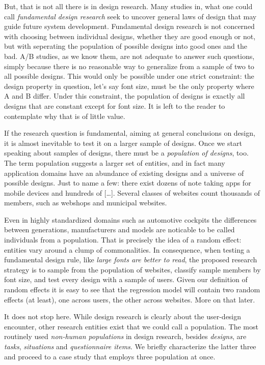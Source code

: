 \documentclass[]{svmono}
\theoremstyle{definition}
\theoremstyle{definition}
\theoremstyle{definition}
\theoremstyle{remark}
\begin{document}
But, that is not all there is in design research. Many studies in, what
one could call \emph{fundamental design research} seek to uncover
general laws of design that may guide future system development.
Fundamental design research is not concerned with choosing between
individual designs, whether they are good enough or not, but with
seperating the population of possible designs into good ones and the
bad. A/B studies, as we know them, are not adequate to answer such
questions, simply because there is no reasonable way to generalize from
a sample of two to all possible designs. This would only be possible
under one strict constraint: the design property in question, let's say
font size, must be the only property where A and B differ. Under this
constraint, the population of designs is exactly all designs that are
constant except for font size. It is left to the reader to contemplate
why that is of little value.

If the research question is fundamental, aiming at general conclusions
on design, it is almost inevitable to test it on a larger sample of
designs. Once we start speaking about samples of designs, there must be
a \emph{population of designs}, too. The term population suggests a
larger set of entities, and in fact many application domains have an
abundance of existing designs and a universe of possible designs. Just
to name a few: there exist dozens of note taking apps for mobile devices
and hundreds of {[}\ldots{}{]}. Several classes of websites count
thousands of members, such as webshops and municipal websites.

Even in highly standardized domains such as automotive cockpits the
differences between generations, manufacturers and models are noticable
to be called individuals from a population. That is precisely the idea
of a random effect: entities vary around a clump of commonalities. In
consequence, when testing a fundamental design rule, like \emph{large
fonts are better to read}, the proposed research strategy is to sample
from the population of websites, classify sample members by font size,
and test every design with a sample of users. Given our definition of
random effects it is easy to see that the regression model will contain
two random effects (at least), one across users, the other across
websites. More on that later.

It does not stop here. While design research is clearly about the
user-design encounter, other research entities exist that we could call
a population. The most routinely used \emph{non-human populations} in
design research, besides \emph{designs}, are \emph{tasks},
\emph{situations} and \emph{questionnaire items}. We briefly
characterize the latter three and proceed to a case study that employs
three population at once.
\end{document}
